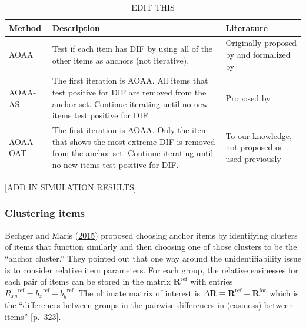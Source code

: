 \documentclass[
  11pt,
]{article}
\begin{document}
\begin{table}[H]
\caption{EDIT THIS}
\centering
\begin{tabular}{|p{2.5cm}|p{6cm}|p{4cm}|}
\toprule

Method & Description & Literature \\

\midrule

AOAA & Test if each item has DIF by using all of the other items as anchors (not iterative). & Originally proposed by \cite{lord1980} and formalized by \cite{thissen1993detection} \\\hline

AOAA-AS & The first iteration is AOAA. All items that test positive for DIF are removed from the anchor set. Continue iterating until no new items test positive for DIF. & Proposed by \cite{drasgow1987study} \\\hline

AOAA-OAT & The first iteration is AOAA. Only the item that shows the most extreme DIF is removed from the anchor set. Continue iterating until no new items test positive for DIF. & To our knowledge, not proposed or used previously \\

\bottomrule
\end{tabular}
\label{table:themethods}
\end{table}

{[}ADD IN SIMULATION RESULTS{]}

\hypertarget{clustering-items}{%
\subsubsection{Clustering items}\label{clustering-items}}

Bechger and Maris (\protect\hyperlink{ref-bechger2015statistical}{2015}) proposed choosing anchor items by identifying clusters of items that function similarly and then choosing one of those clusters to be the \enquote{anchor cluster.} They pointed out that one way around the unidentifiability issue is to consider relative item parameters. For each group, the relative easinesses for each pair of items can be stored in the matrix \(\mathbf{R}^{\text{ref}}\) with entries \({R_{xy}}^{\text{ref}} = {b_x}^{\text{ref}} - {b_y}^{\text{ref}}\). The ultimate matrix of interest is \(\Delta \mathbf{R} \equiv \mathbf{R}^{\text{ref}}-\mathbf{R}^{\text{foc}}\) which is the \enquote{differences between groups in the pairwise differences in (easiness) between items} {[}p.~323{]}.
\end{document}
